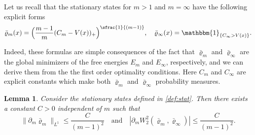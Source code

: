 \documentclass[10pt]{amsart}
\newcommand{\spfrac}[2]{\sfrac{#1}{(#2)}}
\let\mathds\mathbbm
\newcommand{\Bprt}[1]{\Bigl(#1\Bigr)}
\theoremstyle{plain}
\newtheorem{lemma}[theorem]{Lemma}
\theoremstyle{remark}
\begin{document}
Let us recall that the stationary states for $m>1$ and $m=\infty$ have the following explicit forms
\begin{equation}\label{def:stat}
\bar\varrho_m(x) = \Bprt{\frac{m-1}{m}(C_m - V(x))_+}^{\spfrac{1}{m-1}}, \quad \bar\varrho_\infty(x)=\mathds{1}_{\{C_\infty > V(x)\}}.
\end{equation}
{Indeed, these formulas are simple consequences of the fact that $\bar\varrho_m$ and $\bar\varrho_{\infty}$ are the global minimizers of the free energies $E_{m}$ and $E_{\infty}$, respectively, and we can derive them from the the first order optimality conditions. Here $C_{m}$ and $C_{\infty}$ are explicit constants which make both $\bar\varrho_m$ and $\bar\varrho_\infty$ probability measures.
\begin{lemma}\label{lem:sec5}
Consider the stationary states defined in \eqref{def:stat}. Then there exists a constant $C>0$ independent of $m$ such that
\[
\|\partial_m \bar\varrho_m\|_{L^1} \leq \frac{C}{(m-1)^2}\quad\text{and}\quad \left| \partial_m W_2^2(\bar\varrho_m, \bar\varrho_\infty)\right| \leq \frac{C}{(m-1)^2}.
\]
\end{lemma}
}
\end{document}
